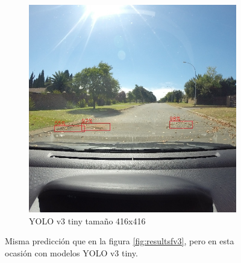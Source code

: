\begin{figure}[H]
\begin{subfigure}[h]{0.45\linewidth}
		\includegraphics[width=\linewidth]{images/results_f_yolo_v3_tiny_416.jpg}
		\caption{YOLO v3 tiny tamaño 416x416}
	\end{subfigure}
	\caption{Misma predicción que en la figura \ref{fig:resultsfv3}, pero en esta ocasión con modelos YOLO v3 tiny.}
	\label{fig:resultsfv3tiny}
\end{figure}